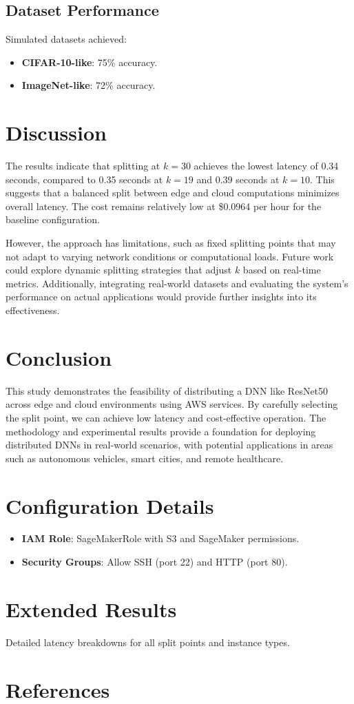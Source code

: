 \documentclass[conference]{IEEEtran}
\begin{document}
\subsection{Dataset Performance}
Simulated datasets achieved:
\begin{itemize}
  \item \textbf{CIFAR-10-like}: 75\% accuracy.
  \item \textbf{ImageNet-like}: 72\% accuracy.
\end{itemize}

\section{Discussion}
The results indicate that splitting at \( k = 30 \) achieves the lowest latency of 0.34 seconds, compared to 0.35 seconds at \( k = 19 \) and 0.39 seconds at \( k = 10 \). This suggests that a balanced split between edge and cloud computations minimizes overall latency. The cost remains relatively low at \$0.0964 per hour for the baseline configuration.

However, the approach has limitations, such as fixed splitting points that may not adapt to varying network conditions or computational loads. Future work could explore dynamic splitting strategies that adjust \( k \) based on real-time metrics. Additionally, integrating real-world datasets and evaluating the system’s performance on actual applications would provide further insights into its effectiveness.

\section{Conclusion}
This study demonstrates the feasibility of distributing a DNN like ResNet50 across edge and cloud environments using AWS services. By carefully selecting the split point, we can achieve low latency and cost-effective operation. The methodology and experimental results provide a foundation for deploying distributed DNNs in real-world scenarios, with potential applications in areas such as autonomous vehicles, smart cities, and remote healthcare.

\appendices
\section{Configuration Details}
\begin{itemize}
  \item \textbf{IAM Role}: SageMakerRole with S3 and SageMaker permissions.
  \item \textbf{Security Groups}: Allow SSH (port 22) and HTTP (port 80).
\end{itemize}

\section{Extended Results}
Detailed latency breakdowns for all split points and instance types.

\section*{References}


\end{document}
